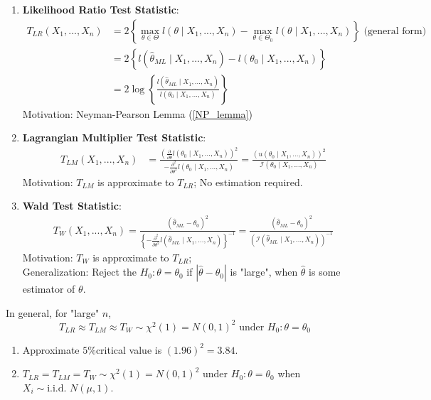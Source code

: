 \documentclass[11pt]{elegantbook}
\begin{document}
\begin{enumerate}[$\bullet$]
    \item \textbf{Likelihood Ratio Test Statistic}:
    \begin{equation}
        \begin{aligned}
            T_{LR}\left(X_1,...,X_n\right)&=2\left\{\max_{\theta\in\Theta}l(\theta\mid X_1,...,X_n)-\max_{\theta\in\Theta_0}l(\theta\mid X_1,...,X_n)\right\} \text{ (general form)}\\
            &=2\left\{l(\hat{\theta}_{ML}\mid X_1,...,X_n)-l(\theta_0\mid X_1,...,X_n)\right\}\\
            &=2\log\left\{\frac{l(\hat{\theta}_{ML}\mid X_1,...,X_n)}{l(\theta_0\mid X_1,...,X_n)}\right\}
        \end{aligned}
        \nonumber
    \end{equation}
    Motivation: Neyman-Pearson Lemma (\ref{NP_lemma})
    \item \textbf{Lagrangian Multiplier Test Statistic}:
    \begin{equation}
        \begin{aligned}
            T_{LM}\left(X_1,...,X_n\right)&=\frac{\left(\frac{\partial}{\partial \theta}l(\theta_0\mid X_1,...,X_n)\right)^2}{-\frac{\partial^2}{\partial \theta^2}l(\theta_0\mid X_1,...,X_n)}=\frac{\left(u(\theta_0\mid X_1,...,X_n)\right)^2}{\mathcal{I}(\theta_0\mid X_1,...,X_n)}
        \end{aligned}
        \nonumber
    \end{equation}
    Motivation: $T_{LM}$ is approximate to $T_{LR}$; No estimation required.
    \item \textbf{Wald Test Statistic}:
    \begin{equation}
        \begin{aligned}
            T_W\left(X_1,...,X_n\right)=\frac{(\hat{\theta}_{ML}-\theta_0)^2}{\left\{-\frac{\partial^2}{\partial \theta^2}l(\hat{\theta}_{ML}\mid X_1,...,X_n)\right\}^{-1}}=\frac{(\hat{\theta}_{ML}-\theta_0)^2}{\left(\mathcal{I}(\hat{\theta}_{ML}\mid X_1,...,X_n)\right)^{-1}}
        \end{aligned}
        \nonumber
    \end{equation}
    Motivation: $T_W$ is approximate to $T_{LR}$;\\
    Generalization: Reject the $H_0:\theta=\theta_0$ if $|\hat{\theta}-\theta_0|$ is "large", when $\hat{\theta}$ is some estimator of $\theta$.
\end{enumerate}
\begin{claim}
    In general, for "large" $n$, $$T_{LR}\approx T_{LM}\approx T_W\sim \chi^2(1)=N(0,1)^2 \text{ under }H_0:\theta=\theta_0$$
    \begin{enumerate}[$\circ$]
        \item Approximate $5\%$critical value is $(1.96)^2=3.84$.
        \item $T_{LR}=T_{LM}=T_W\sim \chi^2(1)=N(0,1)^2 \text{ under }H_0:\theta=\theta_0$ when $X_i\sim \text{i.i.d. }N(\mu,1)$.
    \end{enumerate}
\end{claim}
\end{document}

